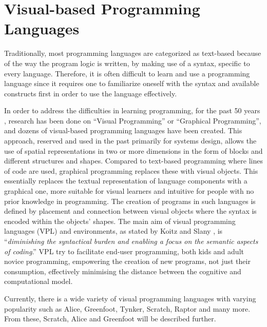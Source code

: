 \section{Visual-based Programming Languages}
\label{sec:visual_based_programming_languages}

Traditionally, most programming languages are categorized as text-based because of the way the program logic is written, by making use of a syntax, specific to every language. Therefore, it is often difficult to learn and use a programming language since it requires one to familiarize oneself with the syntax and available constructs first in order to use the language effectively. 

In order to address the difficulties in learning programming, for the past 50 years \cite{VisualProgHistory}, research has been done on “Visual Programming” or “Graphical Programming”, and dozens of visual-based programming languages have been created. This approach, reserved and used in the past primarily for systems design, allows the use of spatial representations in two or more dimensions in the form of blocks and different structures and shapes. Compared to text-based programming where lines of code are used, graphical programming replaces these with visual objects. This essentially replaces the textual representation of language components with a graphical one, more suitable for visual learners and intuitive for people with no prior knowledge in programming. The creation of programs in such languages is defined by placement and connection between visual objects where the syntax is encoded within the objects' shapes.  
The main aim of visual programming languages (VPL) and environments, as stated by Koitz and Slany \cite{KoitzSlany14}, is “\textit{diminishing the syntactical burden and enabling a focus on the semantic aspects of coding}.” VPL try to facilitate end-user programming, both kids and adult novice programming, empowering the creation of new programs, not just their consumption, effectively minimising the distance between the cognitive and computational model.

Currently, there is a wide variety of visual programming languages with varying popularity such as Alice, Greenfoot, Tynker, Scratch, Raptor and many more. From these, Scratch, Alice and Greenfoot will be described further.

